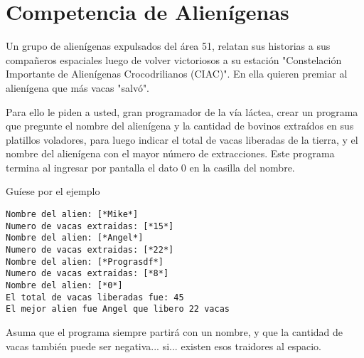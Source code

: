 \section{Competencia de Alienígenas}

Un grupo de alienígenas expulsados del área 51, relatan sus historias a sus compañeros espaciales luego de volver victoriosos a su estación "Constelación Importante de Alienígenas Crocodrilianos (CIAC)". En ella quieren premiar al alienígena que más vacas "salvó".

Para ello le piden a usted, gran programador de la vía láctea, crear un programa que pregunte el nombre del alienígena y la cantidad de bovinos extraídos en sus platillos voladores, para luego indicar el total de vacas liberadas de la tierra, y el nombre del alienígena con el mayor número de extracciones. Este programa termina al ingresar por pantalla el dato 0 en la casilla del nombre.

Guíese por el ejemplo

\begin{lstlisting}[style=consola]
Nombre del alien: [*Mike*]
Numero de vacas extraidas: [*15*]
Nombre del alien: [*Angel*]
Numero de vacas extraidas: [*22*]
Nombre del alien: [*Prograsdf*]
Numero de vacas extraidas: [*8*]
Nombre del alien: [*0*]
El total de vacas liberadas fue: 45
El mejor alien fue Angel que libero 22 vacas
\end{lstlisting}

Asuma que el programa siempre partirá con un nombre, y que la cantidad de vacas también puede ser negativa... si... existen esos traidores al espacio.
